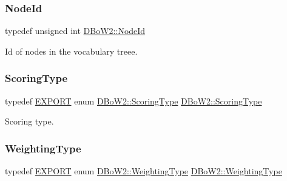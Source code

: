 \mbox{\label{namespace_d_bo_w2_a3a0fa9c50c0df508759362d6204566f2}} 
\subsubsection{\texorpdfstring{Node\+Id}{NodeId}}
{\footnotesize\ttfamily typedef unsigned int \mbox{\hyperlink{namespace_d_bo_w2_a3a0fa9c50c0df508759362d6204566f2}{D\+Bo\+W2\+::\+Node\+Id}}}



Id of nodes in the vocabulary treee. 

\mbox{\label{namespace_d_bo_w2_ad047d6578eacc8aaae7d9cbcd3ded537}} 
\subsubsection{\texorpdfstring{Scoring\+Type}{ScoringType}}
{\footnotesize\ttfamily typedef \mbox{\hyperlink{_d_bo_w2_2_d_utils_2config_8h_a3472d8cdbb788d5f1815b3522595bc49}{E\+X\+P\+O\+RT}} enum \mbox{\hyperlink{namespace_d_bo_w2_aa252a592dd607c6e60dede06ceef2722}{D\+Bo\+W2\+::\+Scoring\+Type}}  \mbox{\hyperlink{namespace_d_bo_w2_aa252a592dd607c6e60dede06ceef2722}{D\+Bo\+W2\+::\+Scoring\+Type}}}



Scoring type. 

\mbox{\label{namespace_d_bo_w2_a66be5c3cd2567ff15eeaf56fd55fffcc}} 
\subsubsection{\texorpdfstring{Weighting\+Type}{WeightingType}}
{\footnotesize\ttfamily typedef \mbox{\hyperlink{_d_bo_w2_2_d_utils_2config_8h_a3472d8cdbb788d5f1815b3522595bc49}{E\+X\+P\+O\+RT}} enum \mbox{\hyperlink{namespace_d_bo_w2_a5de5c8a307aca9a84ffefda2a9bc467a}{D\+Bo\+W2\+::\+Weighting\+Type}}  \mbox{\hyperlink{namespace_d_bo_w2_a5de5c8a307aca9a84ffefda2a9bc467a}{D\+Bo\+W2\+::\+Weighting\+Type}}}



